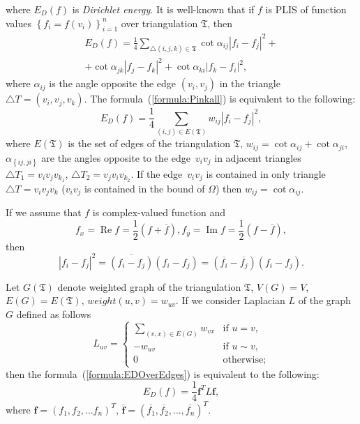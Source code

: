 \documentclass{article}
\newcommand{\conjugate}{\overline}
\newcommand{\re}{\operatorname{Re}}
\newcommand{\im}{\operatorname{Im}}
\begin{document}
where $E_D(f)$ is \textit{Dirichlet energy}. It is well-known \cite{Pinkall93} that if $f$ is PLIS of function values $\left\{f_i = f(v_i)\right\}_{i=1}^n$ over triangulation $\mathfrak{T}$, then  
\begin{multline}
\label{formula:Pinkall}
  E_D(f) = \frac{1}{4} \sum_{\triangle (i, j, k) \in \mathfrak{T}} \cot{\alpha_{ij}}|f_i - f_j|^2 + \\
  + \cot{\alpha_{jk}}|f_j - f_k|^2 + \cot{\alpha_{ki}}|f_k - f_i|^2,
\end{multline}
where $\alpha_{ij}$ is the angle opposite the edge $(v_i, v_j)$ in the triangle $\triangle T = (v_i, v_j, v_k)$. The formula~(\ref{formula:Pinkall}) is equivalent to the following:
\begin{equation}
\label{formula:EDOverEdges}
  E_D(f) = \frac{1}{4} \sum_{\left( i, j \right) \in E\left(\mathfrak{T}\right)}{w_{ij} |f_i - f_j|^2}, 
\end{equation}
where $E(\mathfrak{T})$ is the set of edges of the triangulation $\mathfrak{T}$, $w_{ij}=\cot\alpha_{ij} + \cot\alpha_{ji}$, $\alpha_{\left\{{ij, ji}\right\}}$ are the angles opposite 
to the edge~$v_i v_j$ in adjacent triangles $\triangle T_1=v_i v_j v_{k_1}$, $\triangle T_2=v_j v_i v_{k_2}$. If the edge~$v_i v_j$ is contained in only triangle $\triangle T=v_i v_j v_k$ 
($v_i v_j$ is contained in the bound of $\Omega$) then $w_{ij} = \cot \alpha_{ij}$.

If we assume that $f$ is complex-valued function and 
$$f_x=\re{f}=\frac{1}{2}\left(f + \conjugate{f}\right), f_y=\im{f}=\frac{1}{2}\left(f - \conjugate{f}\right),$$ 
then $$|f_i - f_j|^2 = \conjugate{(f_i - f_j)}(f_i - f_j) = (\conjugate{f_i} - \conjugate{f_j})(f_i - f_j).$$ 

Let $G(\mathfrak{T})$ denote weighted graph of the triangulation $\mathfrak{T}$, $V(G) = V$, $E(G) = E(\mathfrak{T})$, $weight(u, v) = w_{uv}$. If we consider Laplacian $L$ of the graph $G$ defined as follows 
$$L_{uv} = \begin{cases}
  \sum_{(v, x) \in E(G)}{w_{vx}}&\text{if $u = v,$} \\
  -w_{uv}&\text{if $u \sim v,$} \\
  0 &\text{otherwise;}
\end{cases}
$$ then the formula~(\ref{formula:EDOverEdges}) is equivalent to the following:
\begin{equation}
\label{formula:EDOverLaplacian}
E_D(f) = \frac{1}{4} \mathbf{f}^T L \mathbf{f},
\end{equation}
where $\mathbf{f} = (f_1, f_2, \dots f_n)^T$, $\conjugate{\mathbf{f}} = (\conjugate{f_1}, \conjugate{f_2}, \dots, \conjugate{f_n})^T$.
\end{document}
